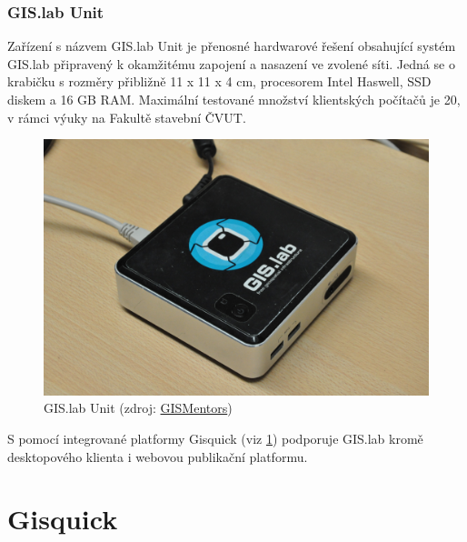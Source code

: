 \subsubsection{GIS.lab Unit}
\label{gislab-unit}
Zařízení s názvem GIS.lab Unit je přenosné hardwarové řešení
obsahující systém GIS.lab připravený k okamžitému zapojení a nasazení
ve zvolené síti. Jedná se o krabičku s rozměry přibližně 11 x 11 x 4
cm, procesorem Intel Haswell, SSD diskem a 16 GB RAM. Maximální
testované množství klientských počítačů je 20, v rámci výuky na
Fakultě stavební ČVUT.

\begin{figure}[H] \centering
    \includegraphics[width=350pt]{./pictures/gislab-unit.jpg}
    \caption[GIS.lab Unit]{GIS.lab Unit (zdroj:
	\href{http://gismentors.cz/wp-content/uploads/2018/12/DSC_0043.jpg}{GISMentors})}
    \label{fig:gislab-unit}
\end{figure}

S pomocí integrované platformy Gisquick (viz \ref{gisquick}) podporuje
GIS.lab kromě desktopového klienta i webovou publikační platformu.

\section{Gisquick}
\label{gisquick}

